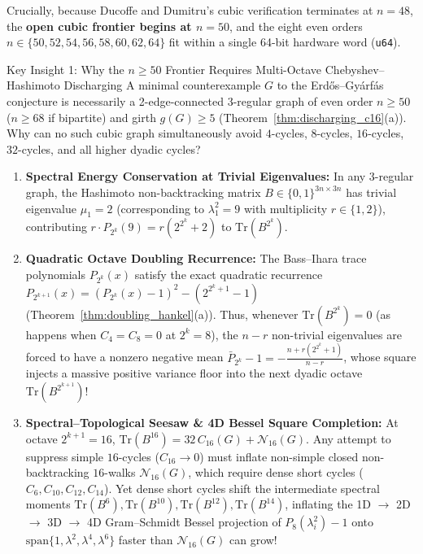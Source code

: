 \documentclass[10pt,a4paper]{article}
\theoremstyle{definition}
\theoremstyle{remark}
\begin{document}
Crucially, because Ducoffe and Dumitru's cubic verification terminates at $n = 48$, the \textbf{open cubic frontier begins at $n = 50$}, and the eight even orders $n \in \{50, 52, 54, 56, 58, 60, 62, 64\}$ fit within a single 64-bit hardware word (\texttt{u64}).

\begin{keyinsight}{Key Insight 1: Why the $n \ge 50$ Frontier Requires Multi-Octave Chebyshev--Hashimoto Discharging}
A minimal counterexample $G$ to the Erd\H{o}s--Gy\'arf\'as conjecture is necessarily a 2-edge-connected 3-regular graph of even order $n \ge 50$ ($n \ge 68$ if bipartite) and girth $g(G) \ge 5$ (Theorem~\ref{thm:discharging_c16}(a)). Why can no such cubic graph simultaneously avoid $4$-cycles, $8$-cycles, $16$-cycles, $32$-cycles, and all higher dyadic cycles?
\begin{enumerate}[nosep,leftmargin=1.5em]
  \item \textbf{Spectral Energy Conservation at Trivial Eigenvalues:} In any 3-regular graph, the Hashimoto non-backtracking matrix $B \in \{0,1\}^{3n \times 3n}$ has trivial eigenvalue $\mu_1 = 2$ (corresponding to $\lambda_1^2 = 9$ with multiplicity $r \in \{1, 2\}$), contributing $r \cdot P_{2^k}(9) = r(2^{2^k} + 2)$ to $\mathrm{Tr}(B^{2^k})$.
  \item \textbf{Quadratic Octave Doubling Recurrence:} The Bass--Ihara trace polynomials $P_{2^k}(x)$ satisfy the exact quadratic recurrence $P_{2^{k+1}}(x) = (P_{2^k}(x) - 1)^2 - (2^{2^k+1} - 1)$ (Theorem~\ref{thm:doubling_hankel}(a)). Thus, whenever $\mathrm{Tr}(B^{2^k}) = 0$ (as happens when $C_4 = C_8 = 0$ at $2^k = 8$), the $n - r$ non-trivial eigenvalues are forced to have a nonzero negative mean $\bar{P}_{2^k} - 1 = -\frac{n + r(2^{2^k}+1)}{n - r}$, whose square injects a massive positive variance floor into the next dyadic octave $\mathrm{Tr}(B^{2^{k+1}})$!
  \item \textbf{Spectral--Topological Seesaw \& 4D Bessel Square Completion:} At octave $2^{k+1} = 16$, $\mathrm{Tr}(B^{16}) = 32\,C_{16}(G) + \mathcal{N}_{16}(G)$. Any attempt to suppress simple $16$-cycles ($C_{16} \to 0$) must inflate non-simple closed non-backtracking $16$-walks $\mathcal{N}_{16}(G)$, which require dense short cycles ($C_6, C_{10}, C_{12}, C_{14}$). Yet dense short cycles shift the intermediate spectral moments $\mathrm{Tr}(B^6), \mathrm{Tr}(B^{10}), \mathrm{Tr}(B^{12}), \mathrm{Tr}(B^{14})$, inflating the 1D $\to$ 2D $\to$ 3D $\to$ 4D Gram--Schmidt Bessel projection of $P_8(\lambda_i^2)-1$ onto $\mathrm{span}\{1, \lambda^2, \lambda^4, \lambda^6\}$ faster than $\mathcal{N}_{16}(G)$ can grow!
\end{enumerate}
\end{keyinsight}
\end{document}

